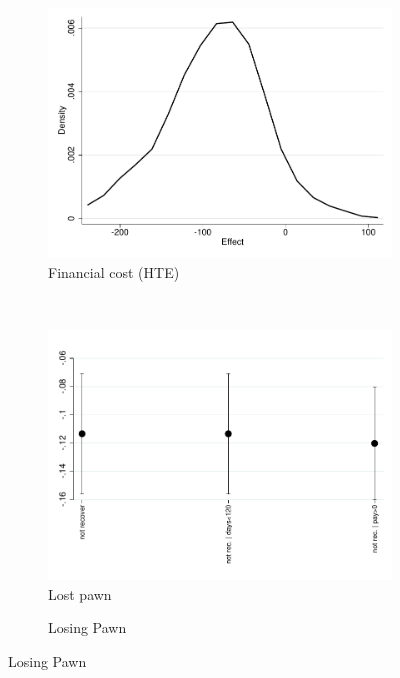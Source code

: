 \documentclass[oneside,11pt]{article}
\begin{document}
\begin{figure}[H]
\begin{center}
    \begin{subfigure}{0.42\textwidth}
        \caption{Financial cost (HTE)}
        \centering
        \includegraphics[width=\textwidth]{Figuras/he_dist_fc_admin_disc_pro_2.pdf}
    \end{subfigure}
    ~
    ~
    \bigskip
    \begin{subfigure}{0.42\textwidth}
        \caption{Lost pawn}
        \centering
        \includegraphics[width=\textwidth]{Figuras/def_te_pro_2.pdf}
    \end{subfigure}
    \begin{subfigure}{0.42\textwidth}
    \caption{Losing Pawn}
        \centering

\end{subfigure}
\end{center}
\end{figure}
\end{document}
